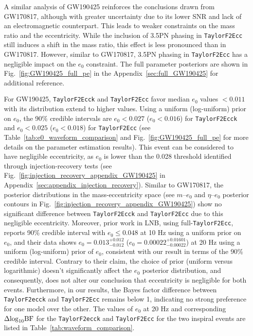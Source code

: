 \documentclass[aps,prd,twocolumn,superscriptaddress,groupedaddress,nofootinbib,showpacs,eqsecnum,useAms]{revtex4-2}
\begin{document}
A similar analysis of GW190425 reinforces the conclusions drawn from GW170817, although with greater uncertainty due to its lower SNR and lack of an electromagnetic counterpart. This leads to weaker constraints on the mass ratio and the eccentricity. While the inclusion of 3.5PN phasing in \texttt{TaylorF2Ecc} still induces a shift in the mass ratio, this effect is less pronounced than in GW170817. However, similar to GW170817, 3.5PN phasing in \texttt{TaylorF2Ecc} has a negligible impact on the $e_0$ constraint. The full parameter posteriors are shown in Fig.~\ref{fig:GW190425_full_pe} in the Appendix~\ref{sec:full_GW190425} for additional reference.

  For GW190425, \texttt{TaylorF2Ecck} and \texttt{TaylorF2Ecc} favor median $e_0$ values $< 0.011$ with its distribution extend to higher values. 
  Using a uniform (log-uniform) prior on $e_0$, the 90\% credible intervals are $e_0 < 0.027$ ($e_0 < 0.016$) for \texttt{TaylorF2Ecck} and $e_0 < 0.025$ ($e_0 < 0.018$) for \texttt{TaylorF2Ecc} (see Table~\ref{tab:e0_waveform_comparison} and Fig.~\ref{fig:GW190425_full_pe} for more details on the parameter estimation results).
 This event can be considered to have negligible eccentricity, as $e_0$ is lower than the 0.028 threshold identified through injection-recovery tests (see Fig.~\ref{fig:injection_recovery_appendix_GW190425} in Appendix~\ref{sec:appendix_injection_recovery}).
  Similar to GW170817, the posterior distributions in the mass-eccentricity space (see $m$--$e_0$ and $\eta$--$e_0$ posterior contours in Fig.~\ref{fig:injection_recovery_appendix_GW190425}) show no significant difference between \texttt{TaylorF2Ecck} and \texttt{TaylorF2Ecc} due to this negligible eccentricity.
  Moreover, prior work in LNB, using full-\texttt{TaylorF2Ecc}, reports 90\% credible interval with $e_0 \leq 0.048$ at 10 Hz using a uniform prior on $e_0$, and their data shows $e_0 = 0.013^{+0.012}_{-0.012}$ ($e_0 = 0.00022^{+0.01601}_{-0.00022}$) at 20 Hz using a uniform (log-uniform) prior of $e_0$, consistent with our result in terms of the 90\% credible interval. 
  Contrary to their claim, the choice of prior (uniform versus logarithmic) doesn't significantly affect the $e_0$ posterior distribution, and consequently, does not alter our conclusion that eccentricity is negligible for both events.
  Furthermore, in our results, the Bayes factor difference between \texttt{TaylorF2ecck} and \texttt{TaylorF2Ecc} remains below 1, indicating no strong preference for one model over the other. 
  The values of $e_0$ at 20 Hz and corresponding $\Delta{\rm log}_{10}{\rm BF}$ for the \texttt{TaylorF2ecck} and \texttt{TaylorF2Ecc} for the two inspiral events are listed in Table~\ref{tab:waveform_comparison}.
\end{document}
